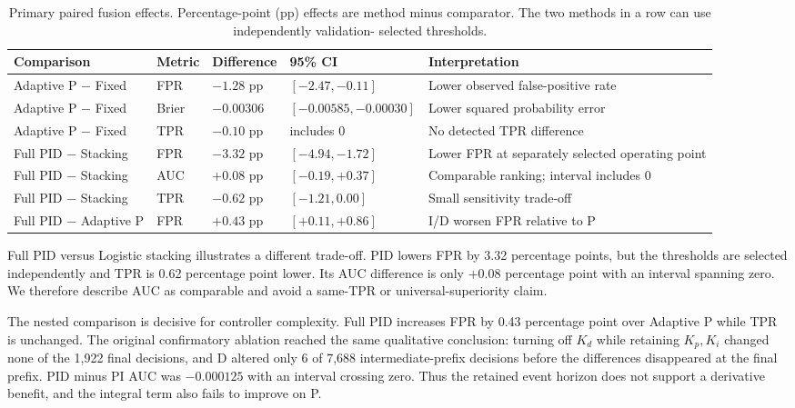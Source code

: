 \begin{table}[t]
\centering
\caption{Primary paired fusion effects. Percentage-point (pp) effects are method
minus comparator. The two methods in a row can use independently validation-
selected thresholds.}
\label{tab:fusion-effects}
\small
\setlength{\tabcolsep}{3.5pt}
\begin{tabular}{p{3.1cm}p{2.6cm}p{2.1cm}p{3.0cm}p{4.0cm}}
\toprule
Comparison & Metric & Difference & 95\% CI & Interpretation \\
\midrule
Adaptive P $-$ Fixed & FPR & $-1.28$ pp & $[-2.47,-0.11]$ & Lower observed false-positive rate \\
Adaptive P $-$ Fixed & Brier & $-0.00306$ & $[-0.00585,-0.00030]$ & Lower squared probability error \\
Adaptive P $-$ Fixed & TPR & $-0.10$ pp & includes 0 & No detected TPR difference \\
Full PID $-$ Stacking & FPR & $-3.32$ pp & $[-4.94,-1.72]$ & Lower FPR at separately selected operating point \\
Full PID $-$ Stacking & AUC & $+0.08$ pp & $[-0.19,+0.37]$ & Comparable ranking; interval includes 0 \\
Full PID $-$ Stacking & TPR & $-0.62$ pp & $[-1.21,0.00]$ & Small sensitivity trade-off \\
Full PID $-$ Adaptive P & FPR & $+0.43$ pp & $[+0.11,+0.86]$ & I/D worsen FPR relative to P \\
\bottomrule
\end{tabular}
\end{table}

Full PID versus Logistic stacking illustrates a different trade-off. PID lowers
FPR by 3.32 percentage points, but the thresholds are selected independently and
TPR is 0.62 percentage point lower. Its AUC difference is only $+0.08$
percentage point with an interval spanning zero. We therefore describe AUC as
comparable and avoid a same-TPR or universal-superiority claim.

The nested comparison is decisive for controller complexity. Full PID increases
FPR by 0.43 percentage point over Adaptive P while TPR is unchanged. The original
confirmatory ablation reached the same qualitative conclusion: turning off
$K_d$ while retaining $K_p,K_i$ changed none of the 1,922 final decisions, and D
altered only 6 of 7,688 intermediate-prefix decisions before the differences
disappeared at the final prefix. PID minus PI AUC was $-0.000125$ with an
interval crossing zero. Thus the retained event horizon does not support a
derivative benefit, and the integral term also fails to improve on P.

